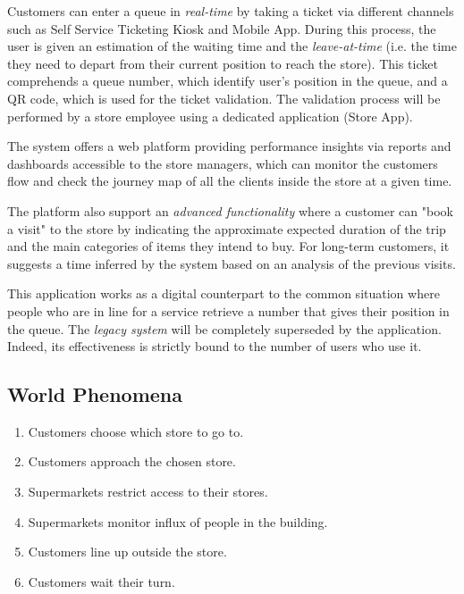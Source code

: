 Customers can enter a queue in \textit{real-time} by taking a ticket via different channels such as Self Service Ticketing Kiosk and Mobile App. During this process, the user is given an estimation of the waiting time and the \textit{leave-at-time} (i.e. the time they need to depart from their current position to reach the store). This ticket comprehends a queue number, which identify user's position in the queue, and a QR code, which is used for the ticket validation.\newline
The validation process will be performed by a store employee using a dedicated application (Store App).

The system offers a web platform providing performance insights via reports and dashboards accessible to the store managers, which can monitor the customers flow and check the journey map of all the clients inside the store at a given time.

The platform also support an \textit{advanced functionality} where a customer can "book a visit" to the store by indicating the approximate expected duration of the trip and the main categories of items they intend to buy. For long-term customers, it suggests a time inferred by the system based on an analysis of the previous visits.

This application works as a digital counterpart to the common situation where people who are in line for a service retrieve a number that gives their position in the queue. The \textit{legacy system} will be completely superseded by the application. Indeed, its effectiveness is strictly bound to the number of users who use it.

\subsection{World Phenomena}
\begin{enumerate}[label=\textbf{WP.\arabic*}]
	\item Customers choose which store to go to.
	\item Customers approach the chosen store.
	\item Supermarkets restrict access to their stores.
	\item Supermarkets monitor influx of people in the building.
	\item Customers line up outside the store.
	\item Customers wait their turn.
\end{enumerate}

